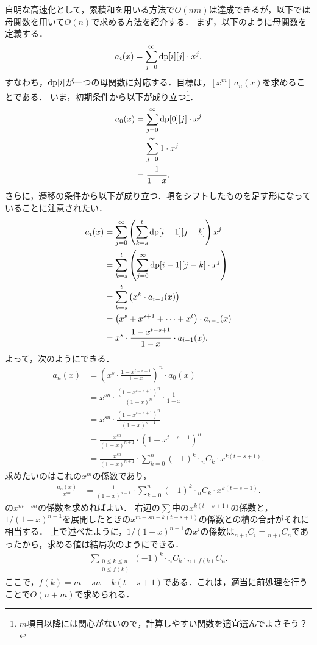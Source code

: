 \documentclass{jsarticle}
\newcommand{\DP}{\ensuremath\mathrm{dp}}
\begin{document}
自明な高速化として，累積和を用いる方法で$O(nm)$は達成できるが，以下では母関数を用いて$O(n)$で求める方法を紹介する．
まず，以下のように母関数を定義する．
\[
a_i(x) = \sum_{j=0}^\infty \DP[i][j]\cdot x^j.
\]
すなわち，$\DP[i]$が一つの母関数に対応する．目標は，$[x^m]\,a_n(x)$を求めることである．
いま，初期条件から以下が成り立つ\footnote{$m$項目以降には関心がないので，計算しやすい関数を適宜選んでよさそう？}．
\begin{align*}
  a_0(x) &= \sum_{j=0}^\infty \DP[0][j]\cdot x^j\\
  &= \sum_{j=0}^\infty 1\cdot x^j\\
  &= \frac{1}{1-x}.
\end{align*}
さらに，遷移の条件から以下が成り立つ．項をシフトしたものを足す形になっていることに注意されたい．
\begin{align*}
  a_i(x) &= \sum_{j=0}^\infty \left(\sum_{k=s}^t \DP[i-1][j-k]\right) x^j\\
  &= \sum_{k=s}^t \left(\sum_{j=0}^\infty \DP[i-1][j-k]\cdot x^j\right)\\
  &= \sum_{k=s}^t \left(x^k\cdot a_{i-1}(x)\right)\\
  &= \left(x^s + x^{s+1} + \dots + x^t\right)\cdot a_{i-1}(x)\\
  &= x^s\cdot \frac{1-x^{t-s+1}}{1-x}\cdot a_{i-1}(x).
\end{align*}
よって，次のようにできる．
\begin{align*}
  a_n(x) &= \left(x^s\cdot \frac{1-x^{t-s+1}}{1-x}\right)^n \cdot a_{0}(x)\\
  &= x^{sn} \cdot \frac{\left(1-x^{t-s+1}\right)^n}{(1-x)^n}\cdot \frac{1}{1-x}\\
  &= x^{sn} \cdot \frac{\left(1-x^{t-s+1}\right)^n}{(1-x)^{n+1}}\\
  &= \frac{x^{sn}}{(1-x)^{n+1}}\cdot\left(1-x^{t-s+1}\right)^n\\
  &= \frac{x^{sn}}{(1-x)^{n+1}}\cdot\sum_{k=0}^n (-1)^k\cdot {}_n C_k\cdot x^{k(t-s+1)}.
\end{align*}
求めたいのはこれの$x^m$の係数であり，
\begin{align*}
  \frac{a_n(x)}{x^{sn}}
  &= \frac{1}{(1-x)^{n+1}}\cdot\sum_{k=0}^n (-1)^k\cdot {}_n C_k\cdot x^{k(t-s+1)}.
\end{align*}
の$x^{m-sn}$の係数を求めればよい．
右辺の$\sum$中の$x^{k(t-s+1)}$の係数と，$1/(1-x)^{n+1}$を展開したときの$x^{m-sn-k(t-s+1)}$の係数との積の合計がそれに相当する．
上で述べたように，$1/(1-x)^{n+1}$の$x^i$の係数は${}_{n+i} C_i={}_{n+i} C_n$であったから，求める値は結局次のようにできる．
\begin{align*}
  \sum_{\substack{0\le k\le n \\ 0\le f(k)}} (-1)^k\cdot {}_n C_k \cdot {}_{n+f(k)} C_n.
\end{align*}
ここで，$f(k) = m-sn-k(t-s+1)$である．これは，適当に前処理を行うことで$O(n+m)$で求められる．
\end{document}
